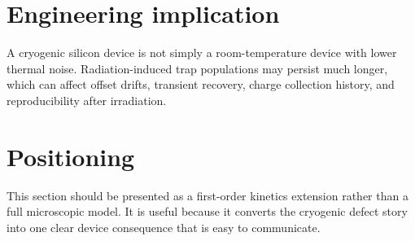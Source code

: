 \documentclass[11pt]{article}
\begin{document}
\section*{Engineering implication}
A cryogenic silicon device is not simply a room-temperature device with lower thermal noise. Radiation-induced trap populations may persist much longer, which can affect offset drifts, transient recovery, charge collection history, and reproducibility after irradiation.

\section*{Positioning}
This section should be presented as a first-order kinetics extension rather than a full microscopic model. It is useful because it converts the cryogenic defect story into one clear device consequence that is easy to communicate.
\end{document}
